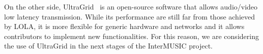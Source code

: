 On the other side, UltraGrid~\cite{holub2006high} is an open-source software that allows audio/video low latency transmission. While its performance are still far from those achieved by LOLA, it is more flexible for generic hardware and networks and it allows contributors to implement  new functionalities. For this reason, we are considering the use of UltraGrid in the next stages of the InterMUSIC project.
